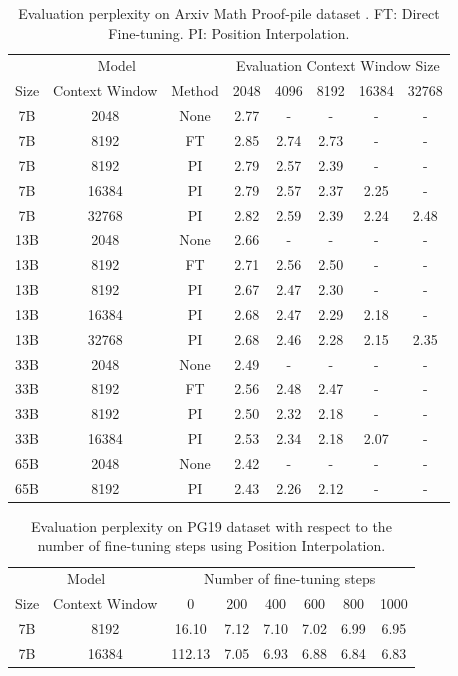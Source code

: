 \documentclass{article} %
\theoremstyle{definition}
\begin{document}
\begin{table}[thbp]
\centering
\begin{tabular}{cccccccc}
\toprule
\multicolumn{3}{c}{Model} & \multicolumn{5}{c}{Evaluation Context Window Size}\\
Size & Context Window & Method & 2048 & 4096 & 8192 & 16384 & 32768 \\
\midrule
7B & 2048 & None & 2.77 & - & - & - & -\\
7B & 8192 & FT &  2.85 & 2.74 & 2.73 & - & -\\
\midrule
7B & 8192 & PI & 2.79 & 2.57 & 2.39 & - & -\\
7B & 16384 & PI & 2.79 & 2.57 & 2.37 & 2.25 & -\\
7B & 32768 & PI & 2.82 & 2.59 & 2.39 & 2.24 & 2.48 \\
\midrule
13B & 2048 & None & 2.66 & - & - & - & -\\
13B & 8192 & FT &  2.71 & 2.56 & 2.50 & - & -\\
\midrule
13B & 8192 & PI & 2.67 & 2.47 & 2.30 & - & -\\
13B & 16384 & PI & 2.68 & 2.47 & 2.29 & 2.18 & -\\
13B & 32768 & PI & 2.68 & 2.46 & 2.28 & 2.15 & 2.35 \\
\midrule
33B & 2048 & None & 2.49 & - & - & - & -\\
33B & 8192 & FT &  2.56 & 2.48 & 2.47 & - & -\\
\midrule
33B & 8192 & PI & 2.50 & 2.32 & 2.18 & - & - \\
33B & 16384 & PI & 2.53 & 2.34 &2.18 & 2.07 & - \\
\midrule
65B & 2048 & None & 2.42 & - & - & - & -\\
\midrule
65B & 8192 & PI & 2.43 & 2.26 & 2.12 & - & - \\
\bottomrule
\end{tabular}
\caption{\small Evaluation perplexity on Arxiv Math Proof-pile dataset \citep{proofpile}. FT: Direct Fine-tuning. PI: Position Interpolation.}
\label{table:perplexity-pile}
\end{table}

\begin{table}[thbp]
\centering
\begin{tabular}{cccccccc}
\toprule
\multicolumn{2}{c}{Model} & \multicolumn{6}{c}{Number of fine-tuning steps}\\
Size &  Context Window  &     0 &  200 &  400 &  600 &  800 &  1000 \\
\midrule
  7B &                 8192 & 16.10 & 7.12 & 7.10 & 7.02 & 6.99 &  6.95 \\
  7B &                 16384 & 112.13 & 7.05 & 6.93 & 6.88 & 6.84 &  6.83 \\
\bottomrule
\end{tabular}
\caption{\small 
Evaluation perplexity on PG19 dataset \citep{Rae2020Compressive} with respect to the number of fine-tuning steps using Position Interpolation.
}
\label{tab:perplexity-finetune}
\end{table}
\end{document}

